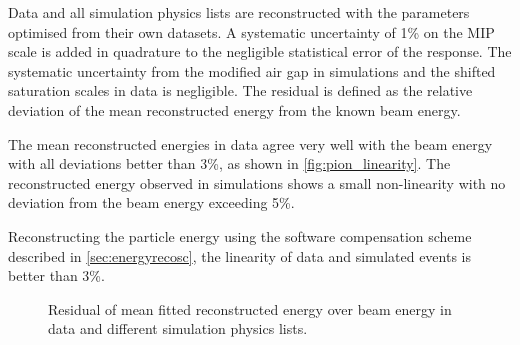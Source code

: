 \documentclass[twoside,a4paper,12pt]{article}
\begin{document}
Data and all simulation physics lists are reconstructed with the parameters optimised from their own datasets. A systematic uncertainty of 1\% on the MIP scale is added in quadrature to the negligible statistical error of the response. The systematic uncertainty from the modified air gap in simulations and the shifted saturation scales in data is negligible. 
The residual is defined as the relative deviation of the mean reconstructed energy from the known beam energy. 

The mean reconstructed energies in data agree very well with the beam energy with all deviations better than 3\%, as shown in \autoref{fig:pion_linearity}.  
The reconstructed energy observed in simulations shows a small non-linearity with no deviation from the beam energy exceeding 5\%. 

Reconstructing the particle energy using the software compensation scheme described in \autoref{sec:energyrecosc}, the linearity of data and simulated events is better than 3\%. 
\begin{figure}[htbp]
\begin{center}
	\hfill
\end{center}
	\caption{Residual of mean fitted reconstructed energy over beam energy in data and different simulation physics lists. }
	\label{fig:pion_linearity}
\end{figure}
\end{document}
